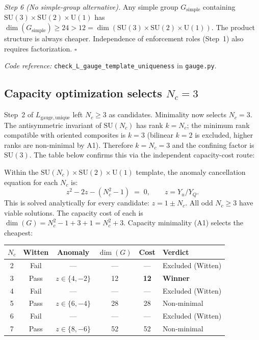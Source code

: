 \documentclass[11pt]{article}
\newcommand{\coderef}[2]{\smallskip\noindent\textit{Code reference:} \texttt{#1} in \texttt{#2}.}
\newcommand{\SU}{\mathrm{SU}}
\newcommand{\U}{\mathrm{U}}
\begin{document}
\begin{tcolorbox}[apfbox, title={Lemma $L_{\mathrm{gauge,unique}}$ (Gauge Template Uniqueness)}]
\medskip\noindent\textit{Step 6 (No simple-group alternative).}  Any simple group $G_{\mathrm{simple}}$ containing $\SU(3) \times \SU(2) \times \U(1)$ has $\dim(G_{\mathrm{simple}}) \ge 24 > 12 = \dim(\SU(3) \times \SU(2) \times \U(1))$.  The product structure is always cheaper.  Independence of enforcement roles (Step~1) also requires factorization.  $\square$

\coderef{check\_L\_gauge\_template\_uniqueness}{gauge.py}
\end{tcolorbox}

\subsection{Capacity optimization selects $N_c = 3$}

Step~2 of $L_{\mathrm{gauge,unique}}$ left $N_c \ge 3$ as candidates.  Minimality now selects $N_c = 3$.  The antisymmetric invariant of $\SU(N_c)$ has rank $k = N_c$; the minimum rank compatible with oriented composites is $k = 3$ (bilinear $k=2$ is excluded, higher ranks are non-minimal by A1).  Therefore $k = N_c = 3$ and the confining factor is $\SU(3)$.  The table below confirms this via the independent capacity-cost route:

Within the $\SU(N_c) \times \SU(2) \times \U(1)$ template, the anomaly cancellation equation for each $N_c$ is:
\begin{equation}
z^2 - 2z - (N_c^2 - 1) \;=\; 0, \qquad z = Y_u / Y_Q.
\label{eq:anomaly_cancel}
\end{equation}
This is solved analytically for every candidate: $z = 1 \pm N_c$.  All odd $N_c \ge 3$ have viable solutions.  The capacity cost of each is $\dim(G) = N_c^2 - 1 + 3 + 1 = N_c^2 + 3$.  Capacity minimality (A1) selects the cheapest:

\begin{center}
\small
\begin{tabular}{cccccl}
\toprule
$N_c$ & Witten & Anomaly & $\dim(G)$ & Cost & Verdict \\
\midrule
2 & Fail & --- & --- & --- & Excluded (Witten) \\
3 & Pass & $z \in \{4, -2\}$ & 12 & \textbf{12} & \textbf{Winner} \\
4 & Fail & --- & --- & --- & Excluded (Witten) \\
5 & Pass & $z \in \{6, -4\}$ & 28 & 28 & Non-minimal \\
6 & Fail & --- & --- & --- & Excluded (Witten) \\
7 & Pass & $z \in \{8, -6\}$ & 52 & 52 & Non-minimal \\
\bottomrule
\end{tabular}
\end{center}
\end{document}
